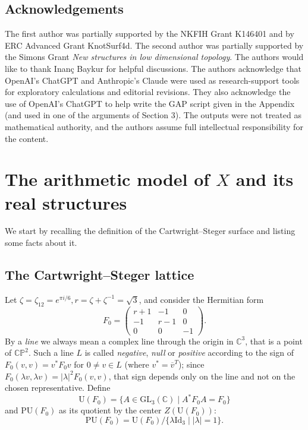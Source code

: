 \documentclass[11pt]{amsart}
\theoremstyle{definition}
\theoremstyle{remark}
\newcommand{\C}{\mathbb C}
\newcommand{\CP}{\mathbb{CP}}
\newcommand{\zetaT}{\zeta_{12}}
\begin{document}
\subsection*{Acknowledgements}
The first author was partially supported by the NKFIH Grant K146401
and by ERC Advanced Grant KnotSurf4d. The second author was partially
supported by the Simons Grant \emph{New structures in low dimensional
topology}.  The authors would like to thank Inan\c{c} Baykur for
helpful discussions.  The authors  acknowledge that
OpenAI’s ChatGPT and Anthropic’s Claude were used as research-support
tools for exploratory calculations and editorial revisions.
They also acknowledge the use of OpenAI's ChatGPT to help write
the GAP script given in the Appendix (and used in one of the arguments of
Section 3).
The outputs were not treated as mathematical authority, and the authors
assume full intellectual responsibility for the content.

\section{The arithmetic model of $X$ and its real structures}\label{sec:arithmetic}

We start by recalling the definition of the Cartwright--Steger surface and
listing some facts about it.

\subsection{The Cartwright--Steger lattice}

Let
$ \zeta=\zetaT=e^{\pi i/6}, r=\zeta+\zeta^{-1}=\sqrt3 $,
and consider the Hermitian form
\[
 F_0=
 \begin{pmatrix}
 r+1&-1&0\\
 -1&r-1&0\\
 0&0&-1
 \end{pmatrix}.
\]
By a \emph{line} we always mean a complex line through the origin in
$\C^3$, that is a point of $\CP^2$.  Such a line $L$ is called
\emph{negative}, \emph{null} or \emph{positive} according to the sign
of $F_0(v,v)=v^*F_0v$ for $0\ne v\in L$ (where $v^*={\overline
  {v}}^T$); since $F_0(\lambda v,\lambda v) =|\lambda|^2F_0(v,v)$,
that sign depends only on the line and not on the chosen
representative. Define
\[
{\mathrm {U}}(F_0)=\{ A\in {\mathrm {GL}}_3(\C )\mid A^*F_0A=F_0\}
\]
and ${\mathrm {PU}}(F_0)$ as its quotient by the center $Z({\mathrm {U}}(F_0))$:
\[
  {\mathrm {PU}}(F_0)={\mathrm {U}}(F_0)/\{\lambda {\mathrm {Id}}_3\mid |\lambda
  |=1\}.
\]
\end{document}
